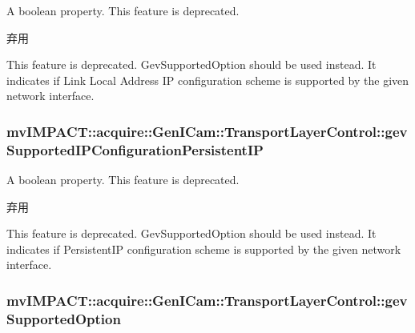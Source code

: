 A boolean property. This feature is deprecated. 

\begin{DoxyRefDesc}{弃用}
\item[\hyperlink{deprecated__deprecated000063}{弃用}]This feature is deprecated. Gev\+Supported\+Option should be used instead. It indicates if Link Local Address I\+P configuration scheme is supported by the given network interface. \end{DoxyRefDesc}
\hypertarget{classmv_i_m_p_a_c_t_1_1acquire_1_1_gen_i_cam_1_1_transport_layer_control_a0f269aa176f62981597215cdceaeb7d1}{
\subsubsection[{gev\+Supported\+I\+P\+Configuration\+Persistent\+I\+P}]{ mv\+I\+M\+P\+A\+C\+T\+::acquire\+::\+Gen\+I\+Cam\+::\+Transport\+Layer\+Control\+::gev\+Supported\+I\+P\+Configuration\+Persistent\+I\+P}}\label{classmv_i_m_p_a_c_t_1_1acquire_1_1_gen_i_cam_1_1_transport_layer_control_a0f269aa176f62981597215cdceaeb7d1}


A boolean property. This feature is deprecated. 

\begin{DoxyRefDesc}{弃用}
\item[\hyperlink{deprecated__deprecated000065}{弃用}]This feature is deprecated. Gev\+Supported\+Option should be used instead. It indicates if Persistent\+I\+P configuration scheme is supported by the given network interface. \end{DoxyRefDesc}
\hypertarget{classmv_i_m_p_a_c_t_1_1acquire_1_1_gen_i_cam_1_1_transport_layer_control_aa8bd58b91d3a71e73c8b0c66fe79ea90}{
\subsubsection[{gev\+Supported\+Option}]{ mv\+I\+M\+P\+A\+C\+T\+::acquire\+::\+Gen\+I\+Cam\+::\+Transport\+Layer\+Control\+::gev\+Supported\+Option}}\label{classmv_i_m_p_a_c_t_1_1acquire_1_1_gen_i_cam_1_1_transport_layer_control_aa8bd58b91d3a71e73c8b0c66fe79ea90}


